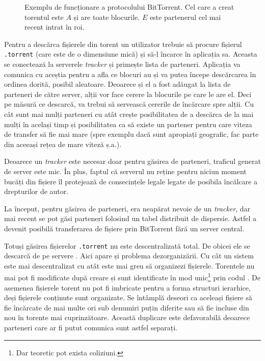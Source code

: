 \documentclass[a4wide,12pt]{report}
\newcommand{\eng}[1]{\emph{#1}} %
\newcommand{\cod}[1]{\texttt{#1}}
\newcommand{\acr}[1]{{\textsmaller[1]{\textsc{#1}}}} %
\begin{document}
\begin{figure}[t]

    \caption{Exemplu de funcționare a protocolului BitTorrent. Cel care a creat torentul este $A$ și are toate
    blocurile. $E$ este partenerul cel mai recent intrat în roi.}
\end{figure}

Pentru a descărca fișierele din torent un utilizator trebuie să procure fișierul \cod{.torrent} (care este de o
dimensiune mică) și să-l încarce în aplicația sa. Aceasta se conectează la serverele \eng{tracker} și primește lista de
parteneri. Aplicația va comunica cu aceștia pentru a afla ce blocuri au și va putea începe descărcarea în ordinea
dorită, posibil aleatoare. Deoarece și el a fost adăugat la lista de parteneri de către server, alții vor face cerere
la blocurile pe care le are el. Deci pe măsură ce descarcă, va trebui să servească cererile de încărcare spre alții. Cu
cât sunt mai mulți parteneri cu atât crește posibilitatea de a descărca de la mai mulți în același timp și posibilitatea
ca să existe un partener pentru care viteza de transfer să fie mai mare (spre exemplu dacă sunt apropiați geografic, fac
parte din aceeași rețea de mare viteză ș.a.).

Deoarece un \eng{tracker} este necesar doar pentru găsirea de parteneri, traficul generat de server este mic. În plus,
faptul că serverul nu reține pentru niciun moment bucăți din fișiere îl protejează de consecințele legale legate de
posibila încălcare a drepturilor de autor.

La început, pentru găsirea de parteneri, era neapărat nevoie de un \eng{tracker}, dar mai recent se pot găsi parteneri
folosind un tabel distribuit de dispersie. Astfel a devenit posibilă transferarea de fișiere prin BitTorrent fără un
server central.

Totuși găsirea fișierelor \cod{.torrent} nu este descentralizată total. De obicei ele se descarcă de pe servere
\acr{HTTP}. Aici apare și problema dezorganizării. Cu cât un sistem este mai descentralizat cu atât este mai greu să
organizezi fișierele. Torentele nu mai pot fi modificate după creare și sunt identificate în mod unic\footnote{Dar
teoretic pot exista coliziuni.} prin codul \acr{SHA-1}. De asemenea fișierele torent nu pot fi imbricate pentru a forma
structuri ierarhice, deși fișierele conținute sunt organizate. Se întâmplă deseori ca aceleași fișiere să fie încărcate
de mai multe ori sub denumiri puțin diferite sau să fie incluse din nou în torente mai cuprinzătoare. Această duplicare
este defavorabilă deoarece parteneri care ar fi putut comunica sunt astfel separați.
\end{document}
